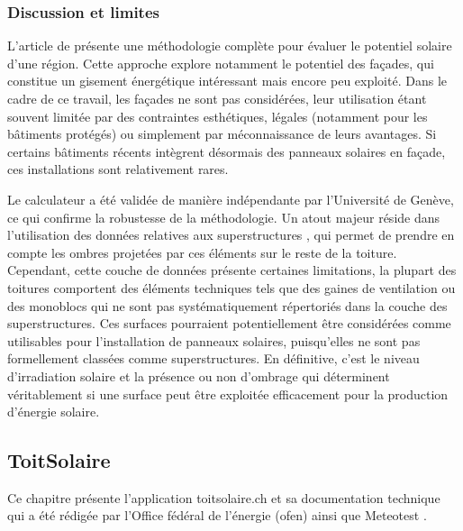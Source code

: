 \subsubsection{Discussion et limites}
\par{L'article de \citeauthor{desthieux_solar_2018} \cite{desthieux_solar_2018} présente une méthodologie complète pour évaluer le potentiel solaire d'une région. Cette approche explore notamment le potentiel des façades, qui constitue un gisement énergétique intéressant mais encore peu exploité. Dans le cadre de ce travail, les façades ne sont pas considérées, leur utilisation étant souvent limitée par des contraintes esthétiques, légales (notamment pour les bâtiments protégés) ou simplement par méconnaissance de leurs avantages. Si certains bâtiments récents intègrent désormais des panneaux solaires en façade, ces installations sont relativement rares.}
\par{Le calculateur a été validée de manière indépendante par l'Université de Genève, ce qui confirme la robustesse de la méthodologie. Un atout majeur réside dans l'utilisation des données relatives aux superstructures \cite{sitg_superstructures_nodate}, qui permet de prendre en compte les ombres projetées par ces éléments sur le reste de la toiture. Cependant, cette couche de données présente certaines limitations, la plupart des toitures comportent des éléments techniques tels que des gaines de ventilation ou des monoblocs qui ne sont pas systématiquement répertoriés dans la couche des superstructures. Ces surfaces pourraient potentiellement être considérées comme utilisables pour l'installation de panneaux solaires, puisqu'elles ne sont pas formellement classées comme superstructures. En définitive, c'est le niveau d'irradiation solaire et la présence ou non d'ombrage qui déterminent véritablement si une surface peut être exploitée efficacement pour la production d'énergie solaire.}

\subsection{ToitSolaire}

\par{Ce chapitre présente l'application toitsolaire.ch \cite{bfe_wie_nodate} et sa documentation technique \cite{klauser_energie_nodate} qui a été rédigée par l'Office fédéral de l'énergie (\acrshort{ofen}) ainsi que Meteotest \cite{meteotest_wir_2025}.}

